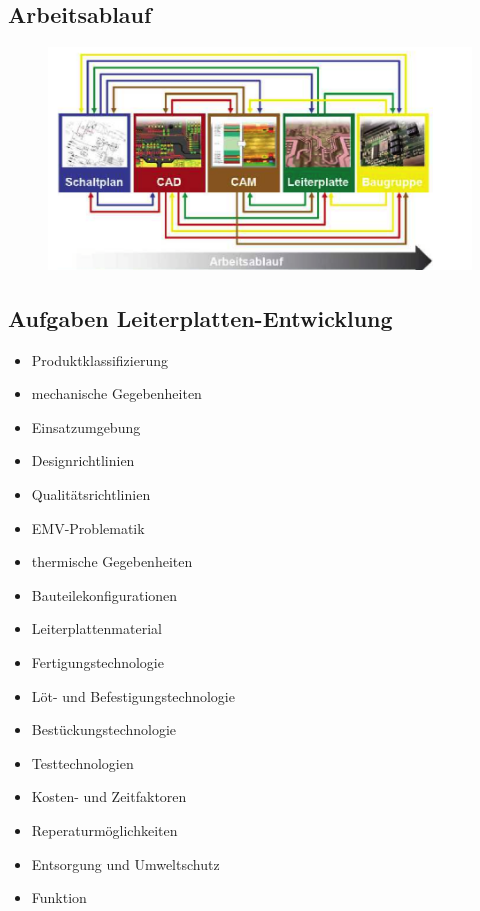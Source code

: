 \subsection{Arbeitsablauf}
\begin{figure}[!htb]
\includegraphics[scale=0.4]{pictures/arbeitsablauf}
\end{figure}

\subsection{Aufgaben Leiterplatten-Entwicklung}
\begin{multicols}{2}
\begin{itemize}
  \item Produktklassifizierung
  \item mechanische Gegebenheiten
  \item Einsatzumgebung
  \item Designrichtlinien
  \item Qualitätsrichtlinien
  \item EMV-Problematik
  \item thermische Gegebenheiten
  \item Bauteilekonfigurationen
  \item Leiterplattenmaterial
  \item Fertigungstechnologie
  \item Löt- und Befestigungstechnologie
  \item Bestückungstechnologie
  \item Testtechnologien
  \item Kosten- und Zeitfaktoren
  \item Reperaturmöglichkeiten
  \item Entsorgung und Umweltschutz
  \item Funktion
\end{itemize}
\end{multicols}

